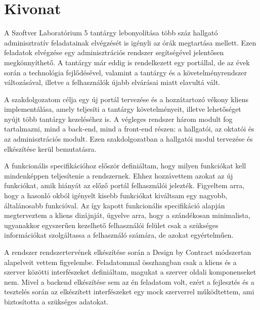 \setcounter{page}{1}

\hungarianParagraph


\chapter*{Kivonat}

A Szoftver Laboratórium 5 tantárgy lebonyolítása több száz hallgató adminisztratív feladatainak elvégzését is igényli az órák megtartása mellett. Ezen feladatok elvégzése egy adminisztrációs rendszer segítségével jelentősen megkönnyíthető. A tantárgy már eddig is rendelkezett egy portállal, de az évek során a technológia fejlődésével, valamint a tantárgy és a követelményrendszer változásával, illetve a felhasználók újabb elvárásai miatt elavultá vált. 

A szakdolgozatom célja egy új portál tervezése és a hozzátartozó vékony kliens implementálása, amely teljesíti a tantárgy követelményeit, illetve lehetőséget nyújt több tantárgy kezeléséhez is. A végleges rendszer három modult fog tartalmazni, mind a back-end, mind a front-end részen: a hallgatói, az oktatói és az adminisztrációs modult. Ezen szakdolgozatban a hallgatói modul tervezése és elkészítése kerül bemutatásra.

A funkcionális specifikációhoz először definiáltam, hogy milyen funkciókat kell mindenképpen teljesítenie a rendszernek. Ehhez hozzávettem azokat az új funkciókat, amik hiányát az előző portál felhasználói jelezték. Figyeltem arra, hogy a hasonló okból igényelt kisebb funkciókat kiváltsam egy nagyobb, általánosabb funkcióval. Az így kapott funkcionális specifikáció alapján megterveztem a kliens dizájnját, ügyelve arra, hogy a szándékosan minimalista, ugyanakkor egyszerűen kezelhető felhasználói felület csak a szükséges információkat szolgáltassa a felhasználó számára, de azokat egyértelműen.

A rendszer rendszertervének elkészítése során  a Design by Contract módszertan alapelveit vettem figyelembe. Feladatommal összhangban csak a kliens és a szerver közötti interfészeket definiáltam, magukat a szerver oldali komponenseket nem. Mivel a backend elkészítése sem az én feladatom volt, ezért a fejlesztés és a tesztelés során az elkészített interfészeket egy mock szerverrel működtettem, ami biztosította a szükséges adatokat. 

